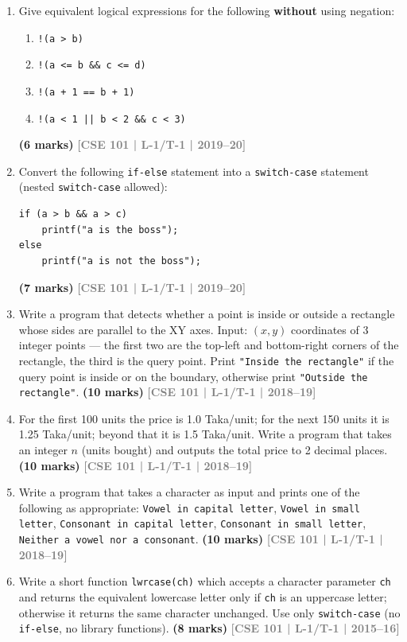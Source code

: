 \documentclass[12pt,a3paper]{article}
\newcommand{\yr}[1]{\hfill\textcolor{gray}{\small\textbf{[#1]}}}
\newcommand{\mk}[1]{\textcolor{orange!70!black}{\small\textbf{(#1 marks)}}}
\begin{document}
\begin{enumerate}
\item Give equivalent logical expressions for the following \textbf{without} using negation:
\begin{enumerate}
  \item \texttt{!(a > b)}
  \item \texttt{!(a <= b \&\& c <= d)}
  \item \texttt{!(a + 1 == b + 1)}
  \item \texttt{!(a < 1 || b < 2 \&\& c < 3)}
\end{enumerate}
\mk{6} \yr{CSE 101 | L-1/T-1 | 2019--20}

\item Convert the following \texttt{if-else} statement into a \texttt{switch-case} statement (nested \texttt{switch-case} allowed):
 
\begin{lstlisting}
if (a > b && a > c)
    printf("a is the boss");
else
    printf("a is not the boss");
\end{lstlisting}
\mk{7} \yr{CSE 101 | L-1/T-1 | 2019--20}

\item Write a program that detects whether a point is inside or outside a rectangle whose sides are parallel to the XY axes. Input: $(x,y)$ coordinates of 3 integer points --- the first two are the top-left and bottom-right corners of the rectangle, the third is the query point. Print \texttt{"Inside the rectangle"} if the query point is inside or on the boundary, otherwise print \texttt{"Outside the rectangle"}.
\mk{10} \yr{CSE 101 | L-1/T-1 | 2018--19}

\item For the first 100 units the price is 1.0 Taka/unit; for the next 150 units it is 1.25 Taka/unit; beyond that it is 1.5 Taka/unit. Write a program that takes an integer $n$ (units bought) and outputs the total price to 2 decimal places.
\mk{10} \yr{CSE 101 | L-1/T-1 | 2018--19}

\item Write a program that takes a character as input and prints one of the following as appropriate: \texttt{Vowel in capital letter}, \texttt{Vowel in small letter}, \texttt{Consonant in capital letter}, \texttt{Consonant in small letter}, \texttt{Neither a vowel nor a consonant}.
\mk{10} \yr{CSE 101 | L-1/T-1 | 2018--19}

\item Write a short function \texttt{lwrcase(ch)} which accepts a character parameter \texttt{ch} and returns the equivalent lowercase letter only if \texttt{ch} is an uppercase letter; otherwise it returns the same character unchanged. Use only \texttt{switch-case} (no \texttt{if-else}, no library functions).
\mk{8} \yr{CSE 101 | L-1/T-1 | 2015--16}


\end{enumerate}
\end{document}

